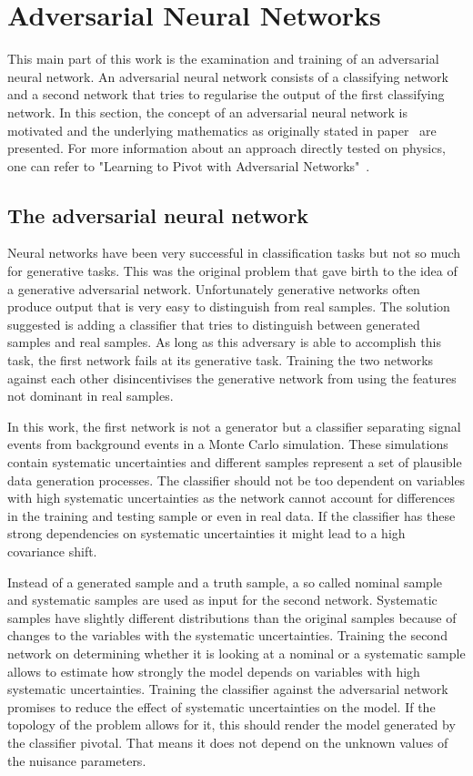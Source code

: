 \section{Adversarial Neural Networks}

This main part of this work is the examination and training of an adversarial neural network. An adversarial neural network consists of a classifying network and a second network that tries to regularise the output of the first classifying network.
%
In this section, the concept of an adversarial neural network is motivated and the underlying mathematics as originally stated in paper~\cite{2014arXiv1406.2661G} are presented.
For more information about an approach directly tested on physics, one can refer to "Learning to Pivot with Adversarial Networks"~\cite{Louppe:2016ylz}.

\subsection{The adversarial neural network}

Neural networks have been very successful in classification tasks but not so much for generative tasks. This was the original problem that gave birth to the idea of a generative adversarial network. Unfortunately generative networks often produce output that is very easy to distinguish from real samples. The solution suggested is adding a classifier that tries to distinguish between generated samples and real samples. As long as this adversary is able to accomplish this task, the first network fails at its generative task. Training the two networks against each other disincentivises the generative network from using the features not dominant in real samples.

In this work, the first network is not a generator but a classifier separating signal events from background events in a Monte Carlo simulation. These simulations contain systematic uncertainties and different samples represent a set of plausible data generation processes. The classifier should not be too dependent on variables with high systematic uncertainties as the network cannot account for differences in the training and testing sample or even in real data. If the classifier has these strong dependencies on systematic uncertainties it might lead to a high covariance shift.

Instead of a generated sample and a truth sample, a so called nominal sample and systematic samples are used as input for the second network. Systematic samples have slightly different distributions than the original samples because of changes to the variables with the systematic uncertainties. Training the second network on determining whether it is looking at a nominal or a systematic sample allows to estimate how strongly the model depends on variables with high systematic uncertainties. Training the classifier against the adversarial network promises to reduce the effect of systematic uncertainties on the model. If the topology of the problem allows for it, this should render the model generated by the classifier pivotal. That means it does not depend on the unknown values of the nuisance parameters.

